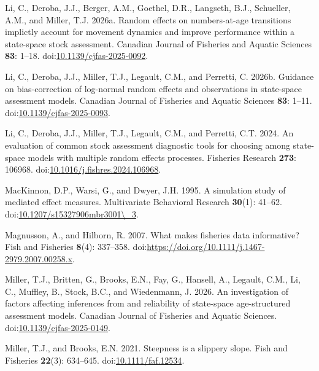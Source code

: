 \documentclass[
  12pt,
]{article}
\newlength{\cslhangindent}
\newenvironment{CSLReferences}[2] %
 {\begin{list}{}{%
  \setlength{\itemindent}{0pt}
  \setlength{\leftmargin}{0pt}
  \setlength{\parsep}{0pt}
  \ifodd #1
   \setlength{\leftmargin}{\cslhangindent}
   \setlength{\itemindent}{-1\cslhangindent}
  \fi
  \setlength{\itemsep}{#2\baselineskip}}}
 {\end{list}}
\begin{document}
\begin{CSLReferences}{1}{0}
Li, C., Deroba, J.J., Berger, A.M., Goethel, D.R., Langseth, B.J.,
Schueller, A.M., and Miller, T.J. 2026a. Random effects on
numbers-at-age transitions implictly account for movement dynamics and
improve performance within a state-space stock assessment. Canadian
Journal of Fisheries and Aquatic Sciences \textbf{83}: 1--18.
doi:\href{https://doi.org/10.1139/cjfas-2025-0092}{10.1139/cjfas-2025-0092}.

Li, C., Deroba, J.J., Miller, T.J., Legault, C.M., and Perretti, C.
2026b. Guidance on bias-correction of log-normal random effects and
observations in state-space assessment models. Canadian Journal of
Fisheries and Aquatic Sciences \textbf{83}: 1--11.
doi:\href{https://doi.org/10.1139/cjfas-2025-0093}{10.1139/cjfas-2025-0093}.

Li, C., Deroba, J.J., Miller, T.J., Legault, C.M., and Perretti, C.T.
2024. An evaluation of common stock assessment diagnostic tools for
choosing among state-space models with multiple random effects
processes. Fisheries Research \textbf{273}: 106968.
doi:\href{https://doi.org/10.1016/j.fishres.2024.106968}{10.1016/j.fishres.2024.106968}.

MacKinnon, D.P., Warsi, G., and Dwyer, J.H. 1995. A simulation study of
mediated effect measures. Multivariate Behavioral Research
\textbf{30}(1): 41--62.
doi:\href{https://doi.org/10.1207/s15327906mbr3001/_3}{10.1207/s15327906mbr3001\textbackslash\_3}.

Magnusson, A., and Hilborn, R. 2007. What makes fisheries data
informative? Fish and Fisheries \textbf{8}(4): 337--358.
doi:\url{https://doi.org/10.1111/j.1467-2979.2007.00258.x}.

Miller, T.J., Britten, G., Brooks, E.N., Fay, G., Hansell, A., Legault,
C.M., Li, C., Muffley, B., Stock, B.C., and Wiedenmann, J. 2026. An
investigation of factors affecting inferences from and reliability of
state-space age-structured assessment models. Canadian Journal of
Fisheries and Aquatic Sciences.
doi:\href{https://doi.org/10.1139/cjfas-2025-0149}{10.1139/cjfas-2025-0149}.

Miller, T.J., and Brooks, E.N. 2021. Steepness is a slippery slope. Fish
and Fisheries \textbf{22}(3): 634--645.
doi:\href{https://doi.org/10.1111/faf.12534}{10.1111/faf.12534}.


\end{CSLReferences}
\end{document}

